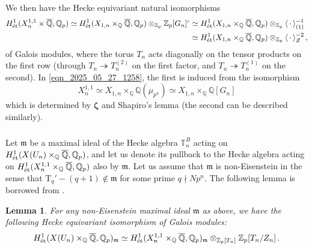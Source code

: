 \documentclass{amsart}
\numberwithin{equation}{section}
\newtheorem{lemma}[theorem]{Lemma}
\newcommand{\QQ}{\mathbb{Q}}
\newcommand{\Qp}{{\mathbb{Q}_p}}
\newcommand{\Zp}{\mathbb{Z}_p}
\newcommand{\ZZ}{\mathbb{Z}}
\newcommand{\TT}{\mathbb{T}}
\newcommand{\etale}{\textup{\'et}}
\newcommand{\m}{\mathfrak{m}}
\newcommand{\Q}{\QQ}
\begin{document}
\subsubsection{} We then have the Hecke equivariant natural isomorphisms
\begin{align}
    \begin{aligned}
        \label{eqn_2025_05_27_1258}
        H^1_\etale(X^{1,1}_n\times\overline{\Q},\QQ_p)\simeq H^1_\etale(X_{1,n} \times_{\QQ} \overline{\Q},\Qp) \otimes_{\Zp} \Zp[G_n]^\iota &\simeq H^1_\etale(X_{1,n} \times_{\QQ} \overline{\Q},\Qp) \otimes_{\Zp}  \langle\,\cdot\,\rangle_{(1)}^{-1}\\
        &\simeq H^1_\etale(X_{1,n} \times_{\QQ} \overline{\Q},\Qp) \otimes_{\Zp} \langle\,\cdot\,\rangle_Z^{-2}\,,
    \end{aligned}
\end{align}  
of Galois modules, where the torus $T_n$ acts diagonally on the tensor products on the first row (through $T_n\twoheadrightarrow T_n^{(2)}$ on the first factor, and $T_n\twoheadrightarrow T_n^{(1)}$ on the second). In \eqref{eqn_2025_05_27_1258}, the first is induced from the isomorphism 
$$X_{n}^{1,1}\simeq X_{1,n}\times_{\QQ}\QQ(\mu_{p^n}) \simeq X_{1,n}\times_{\QQ}\QQ[G_n]$$ 
 which is determined by $\pmb{\zeta}$ and Shapiro's lemma (the second can be described similarly). 
 
\subsubsection{}
Let $\m$ be a maximal ideal of the Hecke algebra $\TT_n^B$ acting on $H^1_\etale(X(U_{n}) \times_{\QQ} \overline{\Q},\Qp)$, and let us denote its pullback to the Hecke algebra acting on $H^1_\etale(X_{n}^{1,1} \times_{\QQ} \overline{\Q},\Qp)$ also by $\m$. Let us assume that $\m$ is non-Eisenstein in the sense that $\mathrm{T}_q'-(q+1)\not\in \m$ for some prime $q\nmid Np^n$. The following lemma is borrowed from \cite{Fouquet2013}.  
\begin{lemma}
     \label{lemma_2025_06_16_1216}
    For any non-Eisenstein maximal ideal $\m$ as above, we have the following Hecke equivariant isomorphism of Galois modules:
    \begin{align}
    \begin{aligned}
        \label{eqn_2025_06_01_0817}
        H^1_\etale(X(U_n)\times_\QQ\overline{\QQ},\QQ_p)_{\m} 
        \simeq H^1_\etale(X_{n}^{1,1} \times_{\QQ} \overline{\Q},\Qp)_{\m} \otimes_{\ZZ_p[T_n]} \ZZ_p[T_n/Z_n]\,.
         \end{aligned}
\end{align} 
\end{lemma}
\end{document}
